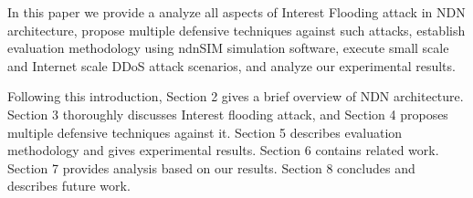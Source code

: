 


In this paper we provide a analyze all aspects of Interest Flooding attack in NDN architecture, propose multiple defensive techniques against such attacks, establish evaluation methodology using ndnSIM simulation software, execute small scale and Internet scale DDoS attack scenarios, and analyze our experimental results.

Following this introduction, Section 2 gives a brief overview of NDN architecture. Section 3 thoroughly discusses Interest flooding attack, and Section 4 proposes multiple defensive techniques against it. Section 5 describes evaluation methodology and gives experimental results. Section 6 contains related work. Section 7 provides analysis based on our results. Section 8 concludes and describes future work.




